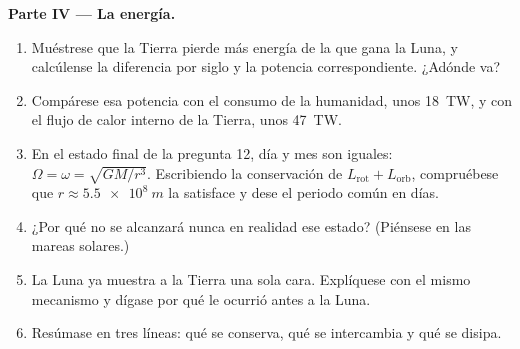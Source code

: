 \begin{problem}
\medskip
\noindent\textbf{Parte IV --- La energía.}
\begin{enumerate}[resume]
  \item Muéstrese que la Tierra pierde más energía de la que gana la Luna,
        y calcúlense la diferencia por siglo y la potencia correspondiente.
        ¿Adónde va?
  \item Compárese esa potencia con el consumo de la humanidad, unos
        \qty{18}{TW}, y con el flujo de calor interno de la Tierra, unos
        \qty{47}{TW}.
  \item En el estado final de la pregunta 12, día y mes son iguales:
        $\Omega = \omega = \sqrt{GM/r^3}$. Escribiendo la conservación de
        $L_{\text{rot}} + L_{\text{orb}}$, compruébese que $r \approx
        \qty{5.5e8}{m}$ la satisface y dese el periodo común en días.
  \item ¿Por qué no se alcanzará nunca en realidad ese estado? (Piénsese
        en las mareas solares.)
  \item La Luna ya muestra a la Tierra una sola cara. Explíquese con el
        mismo mecanismo y dígase por qué le ocurrió antes a la Luna.
  \item Resúmase en tres líneas: qué se conserva, qué se intercambia y qué
        se disipa.
\end{enumerate}
\end{problem}
